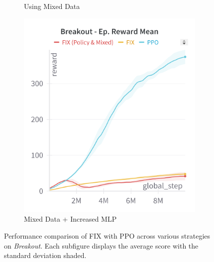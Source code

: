 \begin{figure}[ht]
\begin{subfigure}[b]{0.32\textwidth}
        \caption{Using Mixed Data}
        \label{fig:breakout_fix_mixed}
    \end{subfigure}
    \hfill
    \begin{subfigure}[b]{0.32\textwidth}
        \centering
        \includegraphics[width=\textwidth]{images/breakout_fix_policy_mixed}
        \caption{Mixed Data + Increased MLP}
        \label{fig:breakout_fix_expert_policy}
    \end{subfigure}
    \caption{Performance comparison of FIX with PPO across various strategies on \textit{Breakout}. Each subfigure displays the average score with the standard deviation shaded.}
    \label{fig:breakout_fix_study}
\end{figure}


